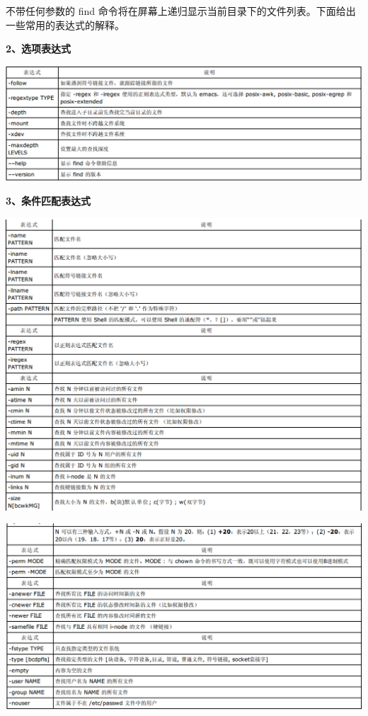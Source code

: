 \documentclass[letterpaper,10pt]{sphinxmanual}
\begin{document}
不带任何参数的 find 命令将在屏幕上递归显示当前目录下的文件列表。下面给出一些常用的表达式的解释。

\textbf{2、选项表达式}

\includegraphics{options.png}

\textbf{3、条件匹配表达式}

\includegraphics{condition.png}

\includegraphics{condition2.png}
\end{document}
